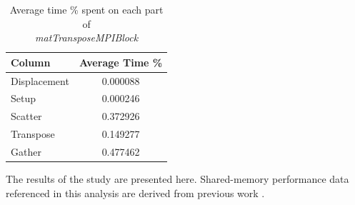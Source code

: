 \documentclass[conference]{IEEEtran}
\begin{document}
\begin{table}[h!]
\centering
\caption{Average time \% spent on each part of \\
\textit{matTransposeMPIBlock}}
\label{tab:normalized_averages}
\begin{tabular}{lc}
\toprule
\textbf{Column} & \textbf{Average Time \%} \\
\midrule
Displacement    & 0.000088 \\
Setup           & 0.000246 \\
Scatter         & 0.372926 \\
Transpose       & 0.149277 \\
Gather          & 0.477462 \\
\midrule
\end{tabular}
\end{table}

The results of the study are presented here. Shared-memory performance
data referenced in this analysis are derived from previous work \cite{b10}.
\end{document}
